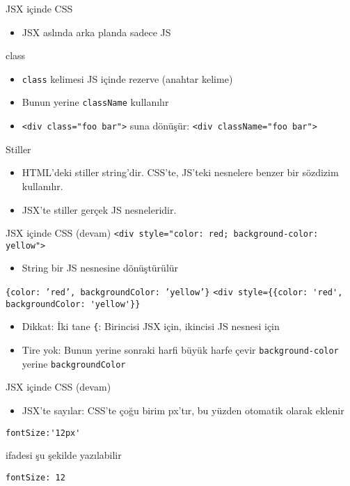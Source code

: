 \documentclass[presentation]{beamer}
\begin{document}
\begin{frame}[fragile,label=sec-10]{JSX içinde CSS}
 \begin{itemize}
\item JSX aslında arka planda sadece JS
\end{itemize}
\begin{block}{class}
\begin{itemize}
\item \texttt{class} kelimesi JS içinde rezerve (anahtar kelime)
\item Bunun yerine \texttt{className} kullanılır
\item \verb~<div class="foo bar">~ suna dönüşür:  \verb~<div className="foo bar">~
\end{itemize}
\end{block}
\begin{block}{Stiller}
\begin{itemize}
\item HTML'deki stiller string'dir. CSS'te, JS'teki nesnelere benzer bir sözdizim
kullanılır.
\item JSX'te stiller gerçek JS nesneleridir.
\end{itemize}
\end{block}
\end{frame}

\begin{frame}[fragile,label=sec-11]{JSX içinde CSS (devam)}
 \verb~<div style="color: red; background-color: yellow">~
\begin{itemize}
\item String bir JS nesnesine dönüştürülür
\end{itemize}
\texttt{\{color: 'red', backgroundColor: 'yellow'\}}
\verb~<div style={{color: 'red', backgroundColor: 'yellow'}}~
\begin{itemize}
\item Dikkat: İki tane \texttt{\{}: Birincisi JSX için, ikincisi JS nesnesi için
\item Tire yok: Bunun yerine sonraki harfi büyük harfe çevir
\texttt{background-color} yerine \texttt{backgroundColor}
\end{itemize}
\end{frame}

\begin{frame}[fragile,label=sec-12]{JSX içinde CSS (devam)}
 \begin{itemize}
\item JSX'te sayılar: CSS'te çoğu birim px'tır, bu yüzden otomatik olarak eklenir
\end{itemize}
\begin{verbatim}
fontSize:'12px'
\end{verbatim}
ifadesi şu şekilde yazılabilir
\begin{verbatim}
fontSize: 12
\end{verbatim}
\end{frame}
\end{document}
